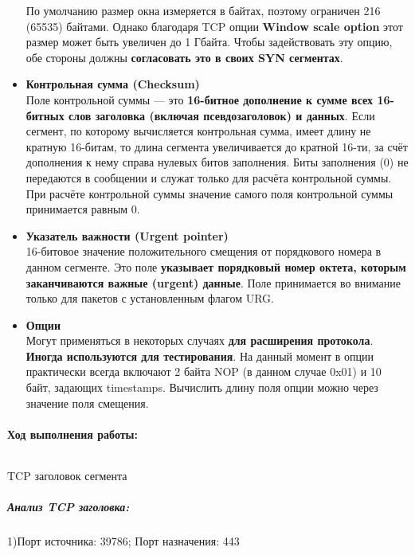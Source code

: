 \begin{itemize}
По умолчанию размер окна измеряется в байтах, поэтому ограничен 216 (65535) байтами. Однако благодаря TCP опции \textbf{Window scale option} этот размер может быть увеличен до 1 Гбайта. Чтобы задействовать эту опцию, обе стороны должны \textbf{согласовать это в своих SYN сегментах}.

\item \textbf{Контрольная сумма (Checksum)}\\
Поле контрольной суммы — это \textbf{16-битное дополнение к сумме всех 16-битных слов заголовка (включая псевдозаголовок) и данных}. Если сегмент, по которому вычисляется контрольная сумма, имеет длину не кратную 16-битам, то длина сегмента увеличивается до кратной 16-ти, за счёт дополнения к нему справа нулевых битов заполнения. Биты заполнения (0) не передаются в сообщении и служат только для расчёта контрольной суммы. При расчёте контрольной суммы значение самого поля контрольной суммы принимается равным 0.

\item \textbf{Указатель важности (Urgent pointer)}\\
16-битовое значение положительного смещения от порядкового номера в данном сегменте. Это поле \textbf{указывает порядковый номер октета, которым заканчиваются важные (urgent) данные}. Поле принимается во внимание только для пакетов с установленным флагом URG.

\item \textbf{Опции}\\
Могут применяться в некоторых случаях \textbf{для расширения протокола}. \textbf{Иногда используются для тестирования}. На данный момент в опции практически всегда включают 2 байта NOP (в данном случае 0x01) и 10 байт, задающих timestamps. Вычислить длину поля опции можно через значение поля смещения.
\end{itemize}


\paragraph{Ход выполнения работы:}
\begin{code}
	\inputminted[breaklines=true, xleftmargin=1em, linenos, frame=single, framesep=10pt, fontsize=\footnotesize, firstline=1, lastline=33]{haskell}{fig/tcp.bash}
	\caption{TCP заголовок сегмента}
    \end{code}
\subparagraph{Анализ TCP заголовка:\\}
1)Порт источника: 39786; Порт назначения: 443\\


